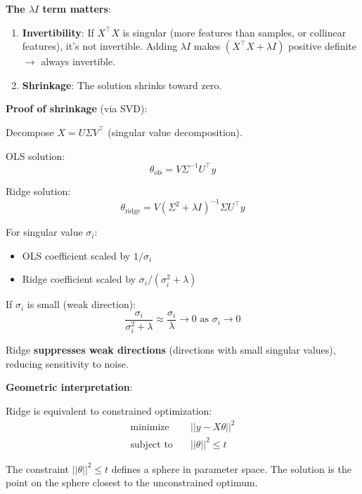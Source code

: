 \textbf{The $\lambda I$ term matters}:

\begin{enumerate}
    \item \textbf{Invertibility}: If $X^\top X$ is singular (more features than samples, or collinear features), it's not invertible. Adding $\lambda I$ makes $(X^\top X + \lambda I)$ positive definite $\rightarrow$ always invertible.

    \item \textbf{Shrinkage}: The solution shrinks toward zero.
\end{enumerate}

\textbf{Proof of shrinkage} (via SVD):

Decompose $X = U\Sigma V^\top$ (singular value decomposition).

OLS solution:
\begin{equation}
\theta_{\text{ols}} = V\Sigma^{-1}U^\top y
\end{equation}

Ridge solution:
\begin{equation}
\theta_{\text{ridge}} = V(\Sigma^2 + \lambda I)^{-1}\Sigma U^\top y
\end{equation}

For singular value $\sigma_i$:
\begin{itemize}
    \item OLS coefficient scaled by $1/\sigma_i$
    \item Ridge coefficient scaled by $\sigma_i/(\sigma_i^2 + \lambda)$
\end{itemize}

If $\sigma_i$ is small (weak direction):
\begin{equation}
\frac{\sigma_i}{\sigma_i^2 + \lambda} \approx \frac{\sigma_i}{\lambda} \to 0 \text{ as } \sigma_i \to 0
\end{equation}

Ridge \textbf{suppresses weak directions} (directions with small singular values), reducing sensitivity to noise.

\textbf{Geometric interpretation}:

Ridge is equivalent to constrained optimization:
\begin{align}
\text{minimize} \quad & ||y - X\theta||^2 \\
\text{subject to} \quad & ||\theta||^2 \leq t
\end{align}

The constraint $||\theta||^2 \leq t$ defines a sphere in parameter space. The solution is the point on the sphere closest to the unconstrained optimum.

